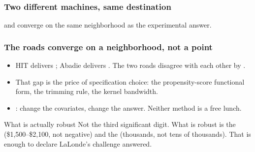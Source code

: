 \documentclass[10pt,aspectratio=169]{beamer}
\begin{document}
\begin{frame}
  \frametitle{Two different machines, same destination}
  \vspace{0.4cm}
  
  \vspace{0.8em}
  \begin{center}
     and  converge
    on the same neighborhood as the experimental answer.\\[0.2em]
  \end{center}
\end{frame}

\begin{frame}
  \frametitle{The roads converge on a neighborhood, not a point}
  \vspace{0.4cm}
  \begin{itemize}
    \item HIT delivers ; Abadie delivers .
    The two roads disagree with each other by .
    \item That gap is the price of specification choice: the propensity-score functional form,
    the trimming rule, the kernel bandwidth.
    \item {}: change the covariates, change the answer.
    Neither method is a free lunch.
  \end{itemize}
  \vspace{0.4em}
  \begin{block}{What is actually robust}
    Not the third significant digit. What is robust is the 
    (\$1{,}500--\$2{,}100, not negative) and the  (thousands,
    not tens of thousands). That is enough to declare LaLonde's challenge answered.
  \end{block}
\end{frame}


\end{document}
